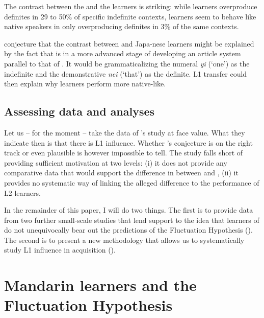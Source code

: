 \documentclass[output=paper,
modfonts
]{langscibook}
\begin{document}
The contrast between the  and the  learners is striking: while  learners overproduce definites in 29 to 50\% of specific indefinite contexts,  learners seem to behave like native speakers in only overproducing definites in 3\% of the same contexts.

\citet{SnapeLeungTing2006} conjecture that the contrast between  and Japa\hyp{}nese learners might be explained by the fact that  is in a more advanced stage of developing an article system parallel to that of . It would be grammaticalizing the numeral \textit{yi} (‘one’) as the indefinite and the demonstrative \textit{nei} (‘that’) as the definite. L1 transfer could then explain why  learners perform more native-like.

\subsection{Assessing data and analyses}

Let us -- for the moment -- take the data of \citeauthor{Ting2005}’s study at face value. What they indicate then is that there is L1 influence. Whether \citeauthor{SnapeLeungTing2006}’s conjecture is on the right track or even plausible is however impossible to tell. The study falls short of providing sufficient motivation at two levels: (i) it does not provide any comparative data that would support the difference in  between  and , (ii) it provides no systematic way of linking the alleged difference to the performance of L2 learners.

In the remainder of this paper, I will do two things. The first is to provide data from two further small-scale studies that lend support to the idea that  learners of  do not unequivocally bear out the predictions of the Fluctuation Hypothesis (). The second is to present a new methodology that allows us to systematically study L1 influence in acquisition ().

\section{Mandarin learners and the Fluctuation Hypothesis}
\label{sec:lebruyn:4}
\end{document}
